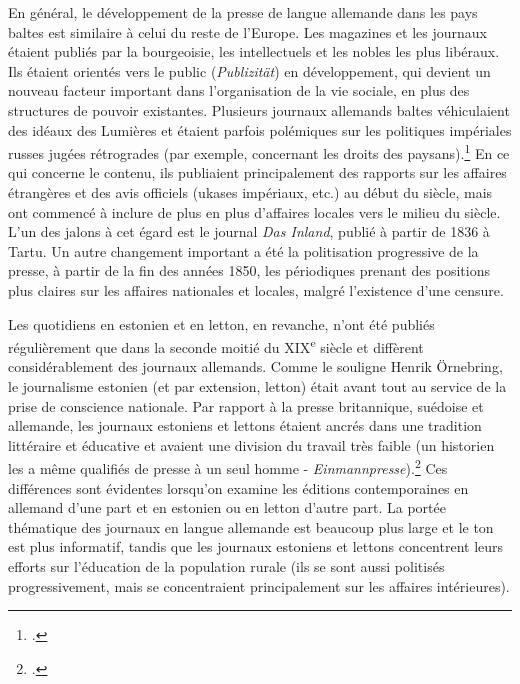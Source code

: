 \documentclass[a4paper,twoside,12pt]{article}
\begin{document}
En général, le développement de la presse de langue allemande dans les pays baltes est similaire à celui du reste de l'Europe. Les magazines et les journaux étaient publiés par la bourgeoisie, les intellectuels et les nobles les plus libéraux. Ils étaient orientés vers le \og public \fg{} (\textit{Publizität}) en développement, qui devient un nouveau facteur important dans l'organisation de la vie sociale, en plus des structures de pouvoir existantes. Plusieurs journaux allemands baltes véhiculaient des idéaux des Lumières et étaient parfois polémiques sur les politiques impériales russes jugées rétrogrades (par exemple, concernant les droits des paysans).\footcite[][302-303]{andresen_eesti_2010} En ce qui concerne le contenu, ils publiaient principalement des rapports sur les affaires étrangères et des avis officiels (ukases impériaux, etc.) au début du siècle, mais ont commencé à inclure de plus en plus d'affaires locales vers le milieu du siècle. L'un des jalons à cet égard est le journal \textit{Das Inland}\label{das_inland}, publié à partir de 1836 à Tartu. Un autre changement important a été la politisation progressive de la presse, à partir de la fin des années 1850, les périodiques prenant des positions plus claires sur les affaires nationales et locales, malgré l'existence d'une censure.

Les quotidiens en estonien et en letton, en revanche, n'ont été publiés régulièrement que dans la seconde moitié du XIX\textsuperscript{e} siècle et diffèrent considérablement des journaux allemands. Comme le souligne Henrik Örnebring, le journalisme estonien (et par extension, letton) était avant tout au service de la prise de conscience nationale. Par rapport à la presse britannique, suédoise et allemande, les journaux estoniens et lettons étaient ancrés dans une tradition littéraire et éducative et avaient une division du travail très faible (un historien les a même qualifiés de \og presse à un seul homme \fg{} - \textit{Einmannpresse}).\footcite{ornebring_journalism_2013} Ces différences sont évidentes lorsqu'on examine les éditions contemporaines en allemand d'une part et en estonien ou en letton d'autre part. La portée thématique des journaux en langue allemande est beaucoup plus large et le ton est plus informatif, tandis que les journaux estoniens et lettons concentrent leurs efforts sur l'éducation de la population rurale (ils se sont aussi politisés progressivement, mais se concentraient principalement sur les affaires intérieures).
\end{document}
